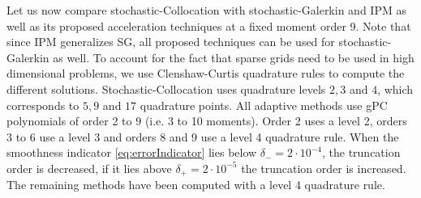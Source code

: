 Let us now compare stochastic-Collocation with stochastic-Galerkin and IPM as well as its proposed acceleration techniques at a fixed moment order 9. Note that since IPM generalizes SG, all proposed techniques can be used for stochastic-Galerkin as well. To account for the fact that sparse grids need to be used in high dimensional problems, we use Clenshaw-Curtis quadrature rules to compute the different solutions. Stochastic-Collocation uses quadrature levels $2,3$ and $4$, which corresponds to $5,9$ and $17$ quadrature points. All adaptive methods use gPC polynomials of order 2 to 9 (i.e. 3 to 10 moments). Order 2 uses a level 2, orders 3 to 6 use a level 3 and orders 8 and 9 use a level 4 quadrature rule. When the smoothness indicator \eqref{eq:errorIndicator} lies below $\delta_{-} = 2\cdot 10^{-4}$, the truncation order is decreased, if it lies above $\delta_{+} = 2\cdot 10^{-5}$ the truncation order is increased. The remaining methods have been computed with a level 4 quadrature rule. 


